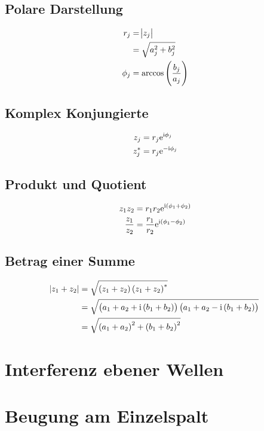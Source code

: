\subsection{Polare Darstellung}

\begin{align*}
    r_j &= \abs{z_j} \\
        &= \sqrt{a_j^2 + b_j^2} \\
    \phi_j &= \darccos{\frac{b_j}{a_j}}
\end{align*}

\subsection{Komplex Konjungierte}

\begin{align*}
    z_j &= r_j\mathrm{e}^{\mathrm i\phi_j} \\
    z_j^* &= r_j\mathrm{e}^{-\mathrm i\phi_j}
\end{align*}

\subsection{Produkt und Quotient}

\begin{align*}
    z_1z_2 &= r_1r_2\eexp{\ii\del{\phi_1+\phi_2}} \\
    \frac{z_1}{z_2} &= \frac{r_1}{r_2} \eexp{\ii\del{\phi_1-\phi_2}}
\end{align*}

\subsection{Betrag einer Summe}

\begin{align*}
    \abs{z_1+z_2} &= \sqrt{\del{z_1+z_2}\del{z_1+z_2}^*} \\
                  &= \sqrt{ \del{a_1+a_2 + \ii\del{b_1+b_2}}\del{a_1+a_2 - \ii\del{b_1+b_2}}} \\
                  &= \sqrt{\del{a_1+a_2}^2 + \del{b_1+b_2}^2}
\end{align*}

\section{Interferenz ebener Wellen}

\section{Beugung am Einzelspalt}


